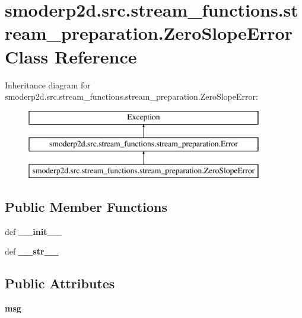 \hypertarget{classsmoderp2d_1_1src_1_1stream__functions_1_1stream__preparation_1_1ZeroSlopeError}{\section{smoderp2d.\-src.\-stream\-\_\-functions.\-stream\-\_\-preparation.\-Zero\-Slope\-Error Class Reference}
\label{classsmoderp2d_1_1src_1_1stream__functions_1_1stream__preparation_1_1ZeroSlopeError}
}
Inheritance diagram for smoderp2d.\-src.\-stream\-\_\-functions.\-stream\-\_\-preparation.\-Zero\-Slope\-Error\-:\begin{figure}[H]
\begin{center}
\leavevmode
\includegraphics[height=3.000000cm]{d1/d84/classsmoderp2d_1_1src_1_1stream__functions_1_1stream__preparation_1_1ZeroSlopeError}
\end{center}
\end{figure}
\subsection*{Public Member Functions}
\begin{DoxyCompactItemize}
\item 
\hypertarget{classsmoderp2d_1_1src_1_1stream__functions_1_1stream__preparation_1_1ZeroSlopeError_ac2efe0eada14a4d9333fc44640e1a71d}{def {\bfseries \-\_\-\-\_\-init\-\_\-\-\_\-}}\label{classsmoderp2d_1_1src_1_1stream__functions_1_1stream__preparation_1_1ZeroSlopeError_ac2efe0eada14a4d9333fc44640e1a71d}

\item 
\hypertarget{classsmoderp2d_1_1src_1_1stream__functions_1_1stream__preparation_1_1ZeroSlopeError_a6f2e5c2a0a2d320a5dc9d4f5cfdcdb34}{def {\bfseries \-\_\-\-\_\-str\-\_\-\-\_\-}}\label{classsmoderp2d_1_1src_1_1stream__functions_1_1stream__preparation_1_1ZeroSlopeError_a6f2e5c2a0a2d320a5dc9d4f5cfdcdb34}

\end{DoxyCompactItemize}
\subsection*{Public Attributes}
\begin{DoxyCompactItemize}
\item 
\hypertarget{classsmoderp2d_1_1src_1_1stream__functions_1_1stream__preparation_1_1ZeroSlopeError_ab41f8e7b39300db9de9b662eee2740be}{{\bfseries msg}}\label{classsmoderp2d_1_1src_1_1stream__functions_1_1stream__preparation_1_1ZeroSlopeError_ab41f8e7b39300db9de9b662eee2740be}

\end{DoxyCompactItemize}


